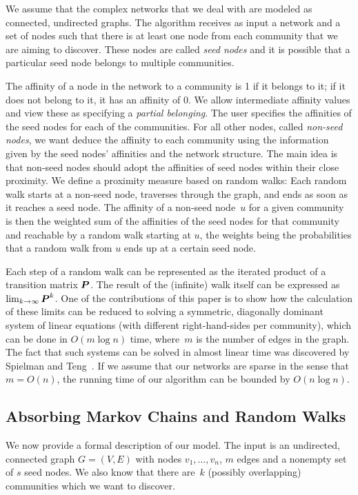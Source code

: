 We assume that the complex networks that we deal with are modeled as connected, undirected graphs.  
The algorithm receives as input a network and a set of nodes such that there is at least one node 
from each community that we are aiming to discover. These nodes are called \emph{seed nodes} and 
it is possible that a particular seed node belongs to multiple communities.

The affinity of a node in the network to a community is 1 if it belongs to it; 
if it does not belong to it, it has an affinity of 0. We allow intermediate affinity 
values and view these as specifying a \emph{partial belonging}. The user specifies the affinities 
of the seed nodes for each of the communities. For all other nodes, called 
\emph{non-seed nodes}, we want deduce the affinity to each community using 
the information given by the seed nodes' affinities and the network structure. 
The main idea is that non-seed nodes should adopt the affinities of seed nodes 
within their close proximity. We define a proximity measure based on random walks: 
Each random walk starts at a non-seed node, traverses through the graph, and ends 
as soon as it reaches a seed node. The affinity of a non-seed node~$u$ for a given 
community is then the weighted sum of the affinities of the seed nodes for 
that community and reachable by a random walk starting at $u$, the weights 
being the probabilities that a random walk from $u$ ends up at a certain seed node.

Each step of a random walk can be represented as the iterated product of 
a transition matrix $\boldsymbol{P}$. The result of the (infinite) walk itself 
can be expressed as $\lim_{k \rightarrow \infty}{\boldsymbol{P}^k}$.
One of the contributions of this paper is to show how the calculation
of these limits can be reduced to solving a symmetric, diagonally dominant
system of linear equations (with different right-hand-sides per community),
which can be done in $O(m \log n)$ time, where~$m$ is the number of edges 
in the graph. The fact that such systems can be solved in almost linear time 
was discovered by Spielman and 
Teng~\cite{ST04,EEST05,ST08,KMP10,KMP11,Vis13}. If we assume that our networks are 
sparse in the sense that $m = O(n)$, the running time of our algorithm can  
be bounded by $O(n \log n)$.    



\subsection{Absorbing Markov Chains and Random Walks}
We now provide a formal description of our model. 
The input is an undirected, connected graph $G = (V,E)$ with nodes $v_1, \ldots, v_n$, 
$m$ edges and a nonempty set of $s$ seed nodes. We also know that there are~$k$ 
(possibly overlapping) communities which we want to discover.


